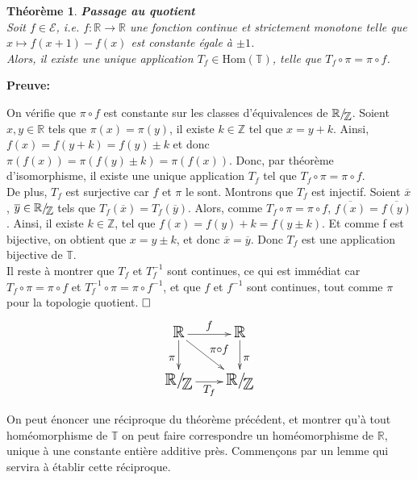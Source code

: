 \documentclass[11pt,a4 paper]{article}
\newtheorem{theoreme}{Théorème}[section]
\newcommand{\Tbb}{\mathbb{T}}
\newcommand{\Rbb}{\mathbb{R}}
\newcommand{\Zbb}{\mathbb{Z}}
\newcommand{\Ec}{\mathcal{E}}
\newcommand*{\EnsembleQuotient}[2]%
{\ensuremath{%
		#1/\!\raisebox{-.65ex}{\ensuremath{\mathcal{#2}}}}}
\newenvironment{thm}{\begin{box_thm}\begin{theoreme}}{\end{theoreme}\end{box_thm}}
\begin{document}
	
\begin{thm}\label{passage au quotient}
	 \textbf{Passage au quotient}\\Soit $f\in \Ec$, i.e. $f: \mathbb{R} \to \mathbb{R}$ une fonction continue et strictement monotone telle que $x\mapsto f(x+1) -f(x)$ est constante égale à $\pm 1$.\\ Alors, il existe une unique application $T_f \in \mathrm{Hom}(\Tbb)$, telle que $T_f\circ \pi = \pi \circ f$.
\end{thm}

	\textbf{Preuve:}
	\par On vérifie que $\pi \circ f$ est constante sur les classes d'équivalences de $\EnsembleQuotient{\Rbb}{\mathbb{Z}}$. Soient $x,y \in \mathbb{R}$ tels que $\pi(x)= \pi(y)$, il existe $k \in \mathbb{Z}$ tel que $x= y +k$. Ainsi, $f(x)=f(y+k)=f(y)\pm k$ et donc $\pi(f(x))=\pi(f(y)\pm k)=\pi(f(x))$. Donc, par théorème d'isomorphisme, il existe une unique application $T_f$ tel que $T_f\circ \pi =\pi \circ f$.\\
	
	De plus, $T_f$ est surjective car $f$ et $\pi$ le sont. Montrons que $T_f$ est injectif. Soient $\overline{x}$, $\overline{y} \in \EnsembleQuotient{\Rbb}{\mathbb{Z}}$ tels que $T_f(\overline{x})= T_f(\overline{y})$. Alors, comme $T_f\circ \pi =\pi \circ f$, $\overline{f(x)}=\overline{f(y)}$. Ainsi, il existe $k \in \mathbb{Z}$, tel que $f(x)=f(y)+k=f(y\pm k)$. Et comme f est bijective, on obtient que $x=y\pm k$, et donc $\overline{x}=\overline{y}$. Donc $T_f$ est une application bijective de $\Tbb$.\\
	
	Il reste à montrer que $T_f$ et $T_f^{-1}$ sont continues, ce qui est immédiat car $T_f\circ\pi=\pi \circ f$ et $T_f^{-1}\circ\pi=\pi\circ f^{-1}$, et que $f$ et $f^{-1}$ sont continues, tout comme $\pi$ pour la topologie quotient. $\hfill \square$\\
	
$$\Large\xymatrix{\Rbb \ar[r]^f \ar[dr]^{\pi\circ f}\ar[d]_\pi &\Rbb \ar[d]^\pi\\
\EnsembleQuotient{\Rbb}{\Zbb} \ar[r]_{T_f}&\EnsembleQuotient{\Rbb}{\Zbb}}$$


\vspace{8mm}


	
On peut énoncer une réciproque du théorème précédent, et montrer qu'à tout homéomorphisme de $\Tbb$ on peut faire correspondre un homéomorphisme de $\Rbb$, unique à une constante entière additive près. Commençons par un lemme qui servira à établir cette réciproque.\\
\end{document}
